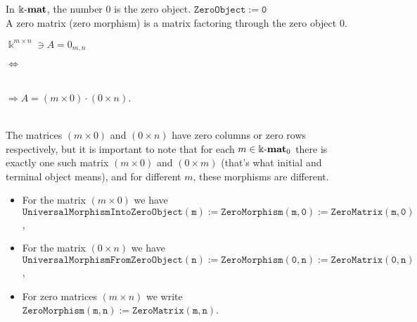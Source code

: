 \begin{example}\label{ex:kmat_pre-additive}
In $\Bbbk\textnormal{-}\mathbf{mat}$, the number $0$ is the zero object. $\mathtt{ZeroObject := 0}$\\
A zero matrix (zero morphism) is a matrix factoring through the zero object $0$.\\
\begin{minipage}{.2\textwidth}\phantom{ }\end{minipage}
\begin{minipage}{.25\textwidth}
$\Bbbk^{m\times n} \ni A = 0_{m,n}$
\end{minipage}
\begin{minipage}{.08\textwidth}
$\Longleftrightarrow$
\end{minipage}
\begin{minipage}{.32\textwidth}
\\
$\Rightarrow A = (m \times 0) \cdot (0 \times n)$.
\end{minipage}
\begin{minipage}{.15\textwidth}\phantom{ }\end{minipage}\\

\noindent The matrices $(m \times 0)$ and $(0 \times n)$ have zero columns or zero rows respectively, but it is
important to note that for each $m \in \Bbbk\textnormal{-}\mathbf{mat}_{0}$ there is exactly one such matrix $(m \times 0)$ and $(0 \times m)$
(that's what initial and terminal object means), and for different $m$, these morphisms are different.

\begin{itemize}
\item For the matrix $(m \times 0)$ we have\\
$\mathtt{UniversalMorphismIntoZeroObject (m) := ZeroMorphism(m, 0) := ZeroMatrix( m, 0 )}$,
\item For the matrix $(0 \times n)$ we have\\
$\mathtt{UniversalMorphismFromZeroObject (n) := ZeroMorphism(0, n) := ZeroMatrix( 0, n )}$,
\item For zero matrices $(m \times n)$ we write $\mathtt{ZeroMorphism(m, n) := ZeroMatrix( m, n )}$.
\end{itemize}


\end{example}
